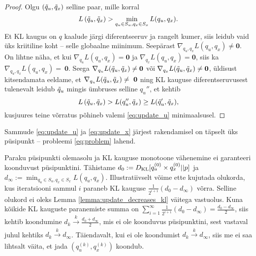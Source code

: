 \begin{proof}
Olgu $(\Tilde{q}_u, \Tilde{q}_x)$ selline paar, mille korral
$$L \left( \Tilde{q}_u, \Tilde{q}_x \right) > \min_{q_u \in S_u, q_x \in S_x} L(q_u, q_x).$$ Et KL kaugus on $q$ kaalude järgi diferentseeruv ja rangelt kumer, siis leidub vaid üks kriitiline koht -- selle globaalne miinimum. Seepärast $\nabla_{q_u, q_x} L(q_u, q_x) \ne \mathbf{0}$. On lihtne näha, et kui $\nabla_{q_u} L(q_u, q_x) = \mathbf{0}$ ja $\nabla_{q_x} L(q_u, q_x)= \mathbf{0}$, siis ka $\nabla_{q_u, q_x} L(q_u, q_x) =~\mathbf{0}$. Seega $\nabla_{q_u} L(\Tilde{q}_u, \Tilde{q}_x) \ne \mathbf{0}$ või $\nabla_{q_x} L(\Tilde{q}_u, \Tilde{q}_x) \ne \mathbf{0}$, üldisust kitsendamata eeldame, et $\nabla_{q_u} L(\Tilde{q}_u, \Tilde{q}_x) \ne~\mathbf{0}$ ning KL kauguse diferentseruvusest tulenevalt leidub $\Tilde{q}_u$ mingis ümbruses selline $q_u''$, et kehtib
$$
L \left( \Tilde{q}_u, \Tilde{q}_x \right) > L(q''_u, \Tilde{q}_x) \ge L(\Tilde{q}'_u, \Tilde{q}_x),
$$
kusjuures teine võrratus põhineb valemi \eqref{eq:update_u} minimaalsusel.
\end{proof}
\begin{corollary}
Sammude \eqref{eq:update_u} ja \eqref{eq:update_x} järjest rakendamisel on täpselt üks püsipunkt -- probleemi \ref{eq:problem} lahend.
\end{corollary}
Paraku püsipunkti olemasolu ja KL kauguse monotoone vähenemine ei garanteeri koonduvust püsipunktini. Tähistame $d_0 := D_{\mathrm{KL}}[q_u^{(0)} \times q_x^{(0)} || p]$ ja $d_\infty :=\min_{q_u \in S_u, q_x \in S_x} L(q_u, q_x)$. Illustratiivselt võime ette kujutada olukorda, kus iteratsiooni sammul $i$ paraneb KL kauguse $\frac{1}{2^{i+1}}(d_0-d_\infty)$ võrra. Selline olukord ei oleks Lemma \ref{lemma:update_decreases_kl} väitega vastuolus. Kuna kõikide KL kauguste paranemiste summa on $\sum_{i=1}^\infty \frac{1}{2^{i+1}}(d_0-d_\infty) =\frac{d_0-d_\infty}{2}$, siis kehtib koondumine $d_k \xrightarrow[]{k} \frac{d_0+d_\infty}{2}$, mis ei ole koonduvus püsipunktini, sest vastaval juhul kehtiks $d_k \xrightarrow[]{k} d_\infty$. Täiendavalt, kui ei ole koondumist $d_k \xrightarrow[]{k} d_\infty$, siis me ei saa lihtsalt väita, et jada $\left( q_u^{(k)}, q_x^{(k)}\right)$ koondub.

